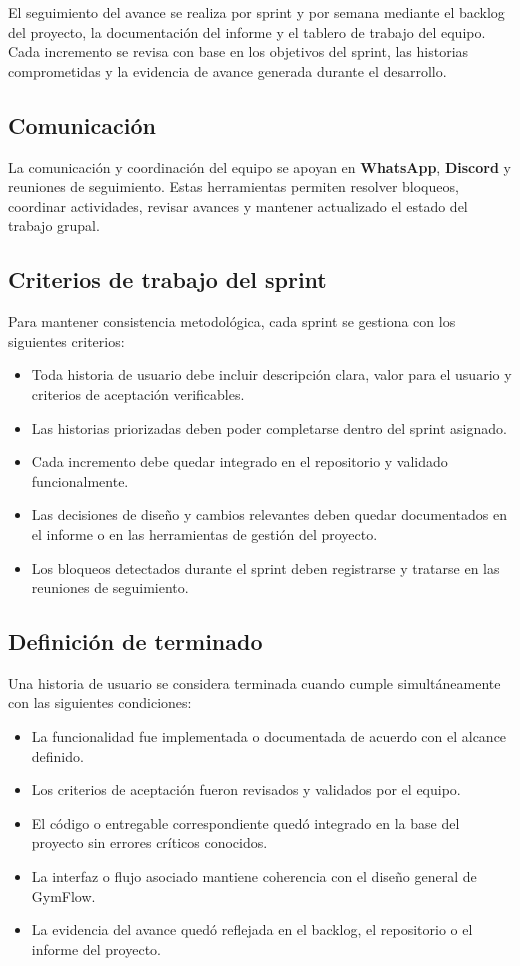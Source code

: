 El seguimiento del avance se realiza por sprint y por semana mediante el backlog del proyecto, la documentación del informe y el tablero de trabajo del equipo. Cada incremento se revisa con base en los objetivos del sprint, las historias comprometidas y la evidencia de avance generada durante el desarrollo.

\subsection{Comunicación}

La comunicación y coordinación del equipo se apoyan en \textbf{WhatsApp}, \textbf{Discord} y reuniones de seguimiento. Estas herramientas permiten resolver bloqueos, coordinar actividades, revisar avances y mantener actualizado el estado del trabajo grupal.

\subsection{Criterios de trabajo del sprint}

Para mantener consistencia metodológica, cada sprint se gestiona con los siguientes criterios:

\begin{itemize}
\item Toda historia de usuario debe incluir descripción clara, valor para el usuario y criterios de aceptación verificables.
\item Las historias priorizadas deben poder completarse dentro del sprint asignado.
\item Cada incremento debe quedar integrado en el repositorio y validado funcionalmente.
\item Las decisiones de diseño y cambios relevantes deben quedar documentados en el informe o en las herramientas de gestión del proyecto.
\item Los bloqueos detectados durante el sprint deben registrarse y tratarse en las reuniones de seguimiento.
\end{itemize}

\subsection{Definición de terminado}

Una historia de usuario se considera terminada cuando cumple simultáneamente con las siguientes condiciones:

\begin{itemize}
\item La funcionalidad fue implementada o documentada de acuerdo con el alcance definido.
\item Los criterios de aceptación fueron revisados y validados por el equipo.
\item El código o entregable correspondiente quedó integrado en la base del proyecto sin errores críticos conocidos.
\item La interfaz o flujo asociado mantiene coherencia con el diseño general de GymFlow.
\item La evidencia del avance quedó reflejada en el backlog, el repositorio o el informe del proyecto.
\end{itemize}

